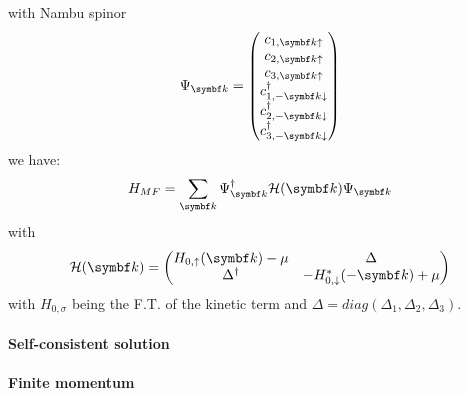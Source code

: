 \documentclass[../notes.tex]{subfiles}
\begin{document}
with Nambu spinor
\begin{equation}
	\Psi_{\vb{k}} =
	\begin{pmatrix}
		c_{1, \vb{k} \uparrow} \\
		c_{2, \vb{k} \uparrow} \\
		c_{3, \vb{k} \uparrow} \\
		c_{1, -\vb{k} \downarrow}^{\dagger} \\
		c_{2, -\vb{k} \downarrow}^{\dagger} \\
		c_{3, -\vb{k} \downarrow}^{\dagger} \\
	\end{pmatrix}
\end{equation}
we have:
\begin{equation}
	H_{MF} = \sum_{\vb{k}} \Psi_{\vb{k}}^{\dagger} \mathcal{H} (\vb{k}) \Psi_{\vb{k}}
\end{equation}
with
\begin{equation}
	\mathcal{H} (\vb{k}) =
	\begin{pmatrix}
		H_{0, \uparrow} (\vb{k}) - \mu & \Delta \\
		\Delta^{\dagger} & - H_{0, \downarrow}^* (-\vb{k}) + \mu
	\end{pmatrix}
\end{equation}
with \(H_{0, \sigma}\) being the F.T. of the kinetic term and \(\Delta = diag(\Delta_1, \Delta_2, \Delta_3)\).


\paragraph{Self-consistent solution}


\paragraph{Finite momentum}

\end{document}
